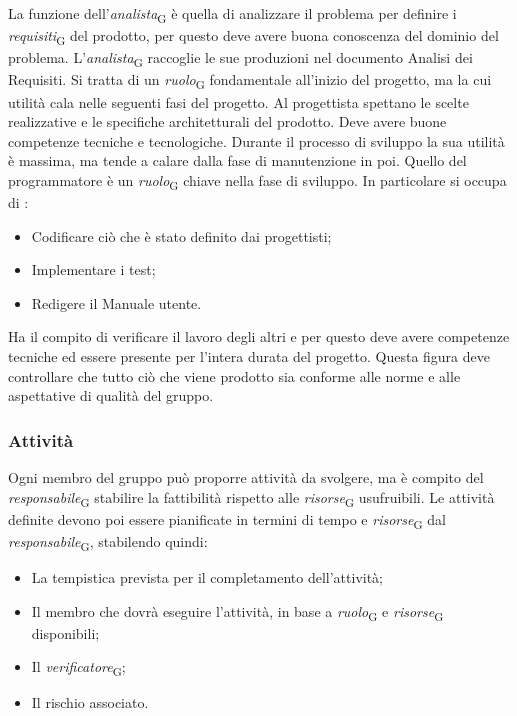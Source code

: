 La funzione dell'\textit{analista}\textsubscript{G} è quella di analizzare il problema per definire i \textit{requisiti}\textsubscript{G} del prodotto, per questo deve avere buona conoscenza del dominio del problema. L'\textit{analista}\textsubscript{G} raccoglie le sue produzioni nel documento Analisi dei Requisiti. Si tratta di un \textit{ruolo}\textsubscript{G} fondamentale all'inizio del progetto, ma la cui utilità cala nelle seguenti fasi del progetto.
Al progettista spettano le scelte realizzative e le specifiche architetturali del prodotto. Deve avere buone competenze tecniche e tecnologiche. Durante il processo di sviluppo la sua utilità è massima, ma tende a calare dalla fase di manutenzione in poi.
Quello del programmatore è un \textit{ruolo}\textsubscript{G} chiave nella fase di sviluppo. In particolare si occupa di :
\begin{itemize}
    \item Codificare ciò che è stato definito dai progettisti;
    \item Implementare i test;
    \item Redigere il Manuale utente.
\end{itemize}
Ha il compito di verificare il lavoro degli altri e per questo deve avere competenze tecniche ed essere presente per l'intera durata del progetto. Questa figura deve controllare che tutto ciò che viene prodotto sia conforme alle norme e alle aspettative di qualità del gruppo.


\subsubsection{Attività}
Ogni membro del gruppo può proporre attività da svolgere, ma è compito del \textit{responsabile}\textsubscript{G} stabilire la fattibilità rispetto alle \textit{risorse}\textsubscript{G} usufruibili. 
Le attività definite devono poi essere pianificate in termini di tempo e \textit{risorse}\textsubscript{G} dal \textit{responsabile}\textsubscript{G}, stabilendo quindi:
\begin{itemize}
    \item La tempistica prevista per il completamento dell'attività;
    \item Il membro che dovrà eseguire l'attività, in base a \textit{ruolo}\textsubscript{G} e \textit{risorse}\textsubscript{G} disponibili;
    \item Il \textit{verificatore}\textsubscript{G};
    \item Il rischio associato.
\end{itemize}

